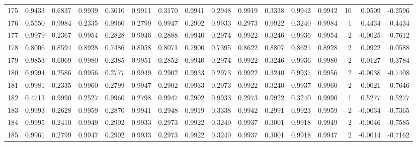 \begin{tabular}{lrrrrrrrrrrrrrrr}
175 &      0.9433 &  0.6837 &  0.9939 &  0.3010 &  0.9911 &  0.3170 &  0.9941 &  0.2948 &  0.9919 &  0.3338 &   0.9942 &     0.9942 &     10 &                    0.0509 &                    -0.2596 \\
176 &      0.5550 &  0.9984 &  0.2335 &  0.9960 &  0.2799 &  0.9947 &  0.2902 &  0.9933 &  0.2973 &  0.9922 &   0.3240 &     0.9984 &      1 &                    0.4434 &                     0.4434 \\
177 &      0.9979 &  0.2367 &  0.9954 &  0.2828 &  0.9946 &  0.2888 &  0.9940 &  0.2974 &  0.9922 &  0.3246 &   0.9936 &     0.9954 &      2 &                   -0.0025 &                    -0.7612 \\
178 &      0.8006 &  0.8594 &  0.8928 &  0.7486 &  0.8058 &  0.8071 &  0.7900 &  0.7395 &  0.8622 &  0.8807 &   0.8621 &     0.8928 &      2 &                    0.0922 &                     0.0588 \\
179 &      0.9853 &  0.6069 &  0.9980 &  0.2385 &  0.9951 &  0.2852 &  0.9940 &  0.2974 &  0.9922 &  0.3246 &   0.9936 &     0.9980 &      2 &                    0.0127 &                    -0.3784 \\
180 &      0.9994 &  0.2586 &  0.9956 &  0.2777 &  0.9949 &  0.2902 &  0.9933 &  0.2973 &  0.9922 &  0.3240 &   0.9937 &     0.9956 &      2 &                   -0.0038 &                    -0.7408 \\
181 &      0.9981 &  0.2335 &  0.9960 &  0.2799 &  0.9947 &  0.2902 &  0.9933 &  0.2973 &  0.9922 &  0.3240 &   0.9937 &     0.9960 &      2 &                   -0.0021 &                    -0.7646 \\
182 &      0.4713 &  0.9990 &  0.2527 &  0.9960 &  0.2798 &  0.9947 &  0.2902 &  0.9933 &  0.2973 &  0.9922 &   0.3240 &     0.9990 &      1 &                    0.5277 &                     0.5277 \\
183 &      0.9993 &  0.2628 &  0.9959 &  0.2870 &  0.9941 &  0.2948 &  0.9919 &  0.3338 &  0.9942 &  0.2991 &   0.9923 &     0.9959 &      2 &                   -0.0034 &                    -0.7365 \\
184 &      0.9995 &  0.2410 &  0.9949 &  0.2902 &  0.9933 &  0.2973 &  0.9922 &  0.3240 &  0.9937 &  0.3001 &   0.9918 &     0.9949 &      2 &                   -0.0046 &                    -0.7585 \\
185 &      0.9961 &  0.2799 &  0.9947 &  0.2902 &  0.9933 &  0.2973 &  0.9922 &  0.3240 &  0.9937 &  0.3001 &   0.9918 &     0.9947 &      2 &                   -0.0014 &                    -0.7162 \\

\end{tabular}

